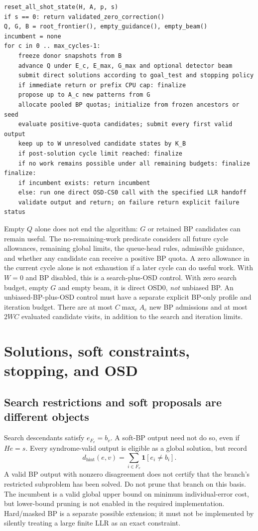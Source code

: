 \documentclass[11pt,a4paper]{article}
\begin{document}
\begin{lstlisting}[caption={Normative controller; candidate-stage details are defined in Section 5.}]
reset_all_shot_state(H, A, p, s)
if s == 0: return validated_zero_correction()
Q, G, B = root_frontier(), empty_guidance(), empty_beam()
incumbent = none
for c in 0 .. max_cycles-1:
    freeze donor snapshots from B
    advance Q under E_c, E_max, G_max and optional detector beam
    submit direct solutions according to goal_test and stopping policy
    if immediate return or prefix CPU cap: finalize
    propose up to A_c new patterns from G
    allocate pooled BP quotas; initialize from frozen ancestors or seed
    evaluate positive-quota candidates; submit every first valid output
    keep up to W unresolved candidate states by K_B
    if post-solution cycle limit reached: finalize
    if no work remains possible under all remaining budgets: finalize
finalize:
    if incumbent exists: return incumbent
    else: run one direct OSD-CS0 call with the specified LLR handoff
    validate output and return; on failure return explicit failure status
\end{lstlisting}

Empty $Q$ alone does not end the algorithm: $G$ or retained BP candidates can remain useful. The no-remaining-work predicate considers all future cycle allowances, remaining global limits, the queue-head rules, admissible guidance, and whether any candidate can receive a positive BP quota. A zero allowance in the current cycle alone is not exhaustion if a later cycle can do useful work. With $W=0$ and BP disabled, this is a search-plus-OSD control. With zero search budget, empty $G$ and empty beam, it is direct OSD0, \emph{not} unbiased BP. An unbiased-BP-plus-OSD control must have a separate explicit BP-only profile and iteration budget. There are at most $C\max_c A_c$ new BP admissions and at most $2WC$ evaluated candidate visits, in addition to the search and iteration limits.

\section{Solutions, soft constraints, stopping, and OSD}
\subsection{Search restrictions and soft proposals are different objects}
Search descendants satisfy $e_{F_v}=b_v$. A soft-BP output need not do so, even if $He=s$. Every syndrome-valid output is eligible as a global solution, but record
\begin{equation}
 d_{\mathrm{hint}}(e,v)=\sum_{i\in F_v}\mathbf1[e_i\neq b_i].
\end{equation}
A valid BP output with nonzero disagreement does not certify that the branch's restricted subproblem has been solved. Do not prune that branch on this basis. The incumbent is a valid global upper bound on minimum individual-error cost, but lower-bound pruning is not enabled in the required implementation. Hard/masked BP is a separate possible extension; it must not be implemented by silently treating a large finite LLR as an exact constraint.
\end{document}
